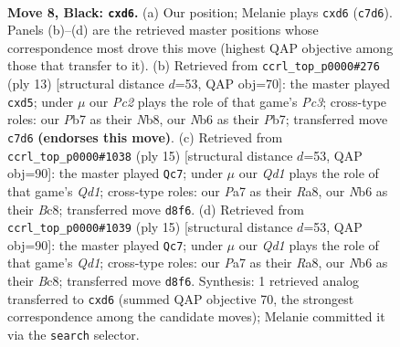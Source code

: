 \documentclass[11pt]{article}
\begin{document}
\begin{figure}[p]\centering
\begin{subfigure}{0.46\textwidth}\centering
\resizebox{\linewidth}{!}{%
\newchessgame
\chessboard[
  setfen={rnbqk2r/ppp2pbp/1n1Pp1p1/8/3P4/1B3N2/PPP2PPP/RNBQ1RK1 b kq - 0 8},
  showmover=false,
  pgfstyle=straightmove, color=movearrow, markmove={c7-d6}
]}
\caption{}
\end{subfigure}\hfill
\begin{subfigure}{0.46\textwidth}\centering
\resizebox{\linewidth}{!}{%
\newchessgame
\chessboard[
  setfen={rnbq1rk1/pp2ppbp/2p2np1/3P4/3P4/5NP1/PP2PPBP/RNBQ1RK1 b - - 0 7},
  showmover=false,
  pgfstyle=straightmove, color=movearrow, markmove={c6-d5}
]}
\caption{}
\end{subfigure}
\\[4pt]
\begin{subfigure}{0.46\textwidth}\centering
\resizebox{\linewidth}{!}{%
\newchessgame
\chessboard[
  setfen={r1bqkb1r/1p3ppp/p1n1pn2/2p5/P1BP4/4PN2/1P2QPPP/RNB2RK1 b kq - 2 8},
  showmover=false,
  pgfstyle=straightmove, color=movearrow, markmove={d8-c7}
]}
\caption{}
\end{subfigure}\hfill
\begin{subfigure}{0.46\textwidth}\centering
\resizebox{\linewidth}{!}{%
\newchessgame
\chessboard[
  setfen={r1bqkb1r/1p3ppp/p1n1pn2/2p5/P1BP4/4PN2/1P2QPPP/RNB2RK1 b kq - 2 8},
  showmover=false,
  pgfstyle=straightmove, color=movearrow, markmove={d8-c7}
]}
\caption{}
\end{subfigure}
\caption{\textbf{Move 8, Black: \texttt{cxd6}.} (a) Our position; Melanie plays \texttt{cxd6} (\texttt{c7d6}). Panels (b)--(d) are the retrieved master positions whose correspondence most drove this move (highest QAP objective among those that transfer to it). (b) Retrieved from \texttt{ccrl\_top\_p0000\#276} (ply 13) [structural distance $d$=53, QAP obj=70]: the master played \texttt{cxd5}; under $\mu$ our \emph{Pc2} plays the role of that game's \emph{Pc3}; cross-type roles: our \emph{P}b7 as their \emph{N}b8, our \emph{N}b6 as their \emph{P}b7; transferred move \texttt{c7d6} \textbf{(endorses this move)}. (c) Retrieved from \texttt{ccrl\_top\_p0000\#1038} (ply 15) [structural distance $d$=53, QAP obj=90]: the master played \texttt{Qc7}; under $\mu$ our \emph{Qd1} plays the role of that game's \emph{Qd1}; cross-type roles: our \emph{P}a7 as their \emph{R}a8, our \emph{N}b6 as their \emph{B}c8; transferred move \texttt{d8f6}. (d) Retrieved from \texttt{ccrl\_top\_p0000\#1039} (ply 15) [structural distance $d$=53, QAP obj=90]: the master played \texttt{Qc7}; under $\mu$ our \emph{Qd1} plays the role of that game's \emph{Qd1}; cross-type roles: our \emph{P}a7 as their \emph{R}a8, our \emph{N}b6 as their \emph{B}c8; transferred move \texttt{d8f6}. Synthesis: 1 retrieved analog transferred to \texttt{cxd6} (summed QAP objective 70, the strongest correspondence among the candidate moves); Melanie committed it via the \texttt{search} selector.}
\label{fig:thought-m15}
\end{figure}
\end{document}
